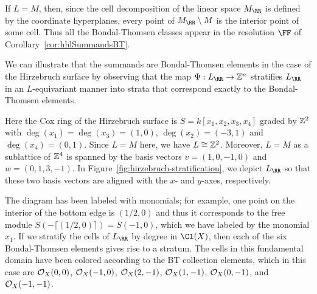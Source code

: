 \documentclass{amsart}
\begin{document}
%
%

\begin{example}
If $L=M$, then, since the cell decomposition of the linear space $M_{\RR}$ is defined by the coordinate
hyperplanes, every point of $M_\RR\setminus M$ is the interior point of some cell. Thus all  the Bondal-Thomsen classes appear in the resolution $\FF$ of Corollary~\ref{cor:hhlSummandsBT}.

\label{ex:resHirzebruch3}
  We can illustrate that the summands are Bondal-Thomsen elements in the case of the Hirzebruch surface by observing that the map $\Psi:L_{\RR} \rightarrow \ZZ^n$ stratifies $L_{\RR}$ in an $L$-equivariant manner into strata that correspond exactly to the Bondal-Thomsen elements.

  Here the Cox ring of the Hirzebruch surface is $S=k[x_1,x_2,x_3,x_4]$ graded by $\mathbb Z^2$ with $\deg(x_1)=\deg(x_3) = (1,0)$, $\deg(x_2)=(-3,1)$ and $\deg(x_4)=(0,1)$. Since $L=M$ here, we have $L\cong \mathbb Z^2$. Moreover, $L=M$ as a sublattice of $\mathbb Z^4$ is spanned by the basis vectors $v=(1,0,-1,0)$ and $w=(0,1,3,-1)$. In Figure~\ref{fig:hirzebruch-stratification}, we depict $L_{\RR}$ so that these two basis vectors are aligned with the $x$- and $y$-axes, respectively.
  
The diagram has been labeled with monomials; for example, one point on the interior of the bottom edge is $(1/2,0)$ and thus it corresponds to the free module $S(-\lceil(1/2,0)\rceil) = S(-1,0)$, which we have labeled by the monomial $x_1$. If we stratify the cells of $L_{\RR}$ by degree in $\Cl(X)$, then each of the six Bondal-Thomsen elements gives rise to a stratum.
The cells in this fundamental domain have been colored according to the BT collection elements, which in this case are ${\mathcal O}_{X}(0,0)$, ${\mathcal O}_{X}(-1,0)$, ${\mathcal O}_{X}(2,-1)$, ${\mathcal O}_{X}(1,-1)$, ${\mathcal O}_{X}(0,-1)$, and ${\mathcal O}_{X}(-1,-1)$.


\end{example}
\end{document}

